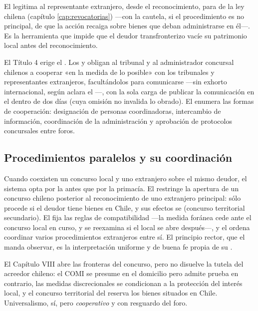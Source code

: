 El  legitima al representante extranjero, desde el reconocimiento, para  de la ley chilena (capítulo \ref{cap:revocatorias}) ---con
la cautela, si el procedimiento es no principal, de que la acción recaiga sobre bienes que deban
administrarse en él---. Es la herramienta que impide que el deudor transfronterizo vacíe su
patrimonio local antes del reconocimiento.

El Título 4 erige el . Los  y
 obligan al tribunal y al administrador concursal chilenos a cooperar «en la medida de lo
posible» con los tribunales y representantes extranjeros, facultándolos para comunicarse
 ---sin exhorto internacional, según aclara el ---, con la sola
carga de publicar la comunicación en el \boletin{} dentro de dos días (cuya omisión no invalida lo
obrado). El  enumera las formas de cooperación: designación de personas coordinadoras,
intercambio de información, coordinación de la administración y aprobación de protocolos
concursales entre foros.

\subsection{Procedimientos paralelos y su coordinación}

Cuando coexisten un concurso local y uno extranjero sobre el mismo deudor, el sistema opta por la
 antes que por la primacía. El  restringe la apertura de un
concurso chileno posterior al reconocimiento de uno extranjero principal: sólo procede si el deudor
tiene bienes en Chile, y sus efectos se  (concurso territorial
secundario). El  fija las reglas de compatibilidad ---la medida foránea cede ante el
concurso local en curso, y se reexamina si el local se abre después---, y el  ordena
coordinar varios procedimientos extranjeros entre sí. El principio rector, que el  manda
observar, es la interpretación uniforme y de buena fe propia de su .

\begin{foco}
El Capítulo VIII abre las fronteras del concurso, pero no disuelve la tutela del acreedor chileno:
el COMI se presume en el domicilio pero admite prueba en contrario, las medidas discrecionales se
condicionan a la protección del interés local, y el concurso territorial del  reserva los
bienes situados en Chile. Universalismo, sí, pero \emph{cooperativo} y con resguardo del foro.
\end{foco}

